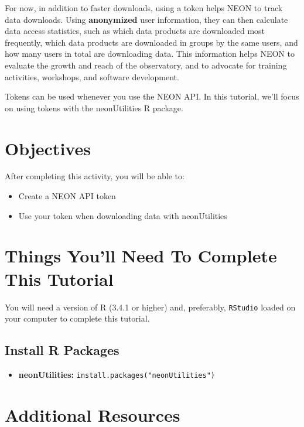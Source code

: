 \documentclass[]{book}
\providecommand{\tightlist}{%
  \setlength{\itemsep}{0pt}\setlength{\parskip}{0pt}}
\begin{document}
For now, in addition to faster downloads, using a token helps NEON to track
data downloads. Using \textbf{anonymized} user information, they can then calculate
data access statistics, such as which data products are downloaded most
frequently, which data products are downloaded in groups by the same users,
and how many users in total are downloading data. This information helps NEON
to evaluate the growth and reach of the observatory, and to advocate for
training activities, workshops, and software development.

Tokens can be used whenever you use the NEON API. In this tutorial, we'll
focus on using tokens with the neonUtilities R package.

\hypertarget{ds-objectives}{}
\hypertarget{objectives}{%
\section{Objectives}\label{objectives}}

After completing this activity, you will be able to:

\begin{itemize}
\tightlist
\item
  Create a NEON API token
\item
  Use your token when downloading data with neonUtilities
\end{itemize}

\hypertarget{things-youll-need-to-complete-this-tutorial}{%
\section{Things You'll Need To Complete This Tutorial}\label{things-youll-need-to-complete-this-tutorial}}

You will need a version of R (3.4.1 or higher) and, preferably, \texttt{RStudio}
loaded on your computer to complete this tutorial.

\hypertarget{install-r-packages}{%
\subsection{Install R Packages}\label{install-r-packages}}

\begin{itemize}
\tightlist
\item
  \textbf{neonUtilities:} \texttt{install.packages("neonUtilities")}
\end{itemize}

\hypertarget{additional-resources}{%
\section{Additional Resources}\label{additional-resources}}
\end{document}
